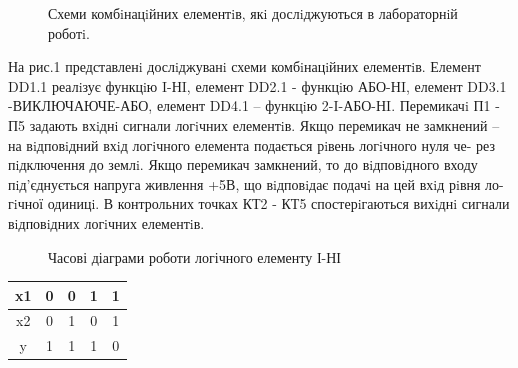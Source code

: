 \documentclass[a4paper,14pt]{extreport}
\begin{document}
\begin{figure}[h]
	\caption{Схеми комбiнацiйних елементiв, якi дослiджуються в лабораторнiй роботi.}
	\label{ris1}
\end{figure}

На рис.1 представленi дослiджуванi схеми комбiнацiйних елементiв. Елемент
DD1.1 реалiзує функцiю I-НI, елемент DD2.1 - функцiю АБО-НI, елемент DD3.1
-ВИКЛЮЧАЮЧЕ-АБО, елемент DD4.1 – функцiю 2-I-АБО-НI. Перемикачi П1 -
П5 задають вхiднi сигнали логiчних елементiв. Якщо перемикач не замкнений
– на вiдповiдний вхiд логiчного елемента подається рiвень логiчного нуля че-
рез пiдключення до землi. Якщо перемикач замкнений, то до вiдповiдного входу
пiд’єднується напруга живлення +5В, що вiдповiдає подачi на цей вхiд рiвня ло-
гiчної одиницi. В контрольних точках КТ2 - КТ5 спостерiгаються вихiднi сигнали
вiдповiдних логiчних елементiв.

\clearpage
\begin{center}
\end{center}

\begin{figure}[h]
	\caption{Часові діаграми роботи логічного елементу І-НІ}
	\label{ris2}
\end{figure}
\begin{table}[h!]
	\begin{center}
	\begin{tabular}{|c|c|c|c|c|}
	\hline
	x1 & 0 & 0 & 1 & 1 \\ \hline
	x2 & 0 & 1 & 0 & 1 \\ \hline
	y  & 1 & 1 & 1 & 0 \\ \hline
	\end{tabular}
	\end{center}
\end{table}
\end{document}
